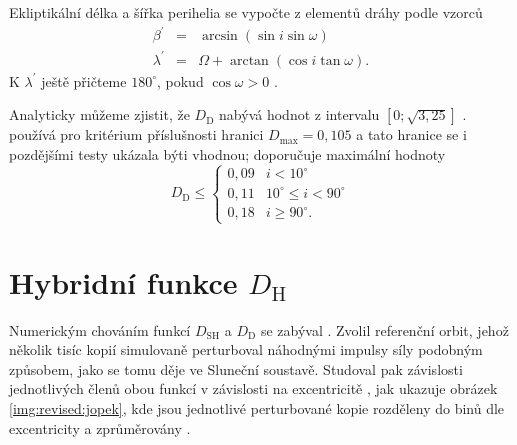 Ekliptikální délka a šířka perihelia se vypočte z elementů dráhy podle vzorců \cite{cometassoc}
\begin{eqnarray}
    \beta^\prime &=& \arcsin{\left( \sin{i}\sin{\omega} \right)}\\
    \lambda^\prime &=& \Omega + \arctan{\left( \cos{i}\tan{\omega} \right)} \text{.}
\end{eqnarray}
K $\lambda^\prime$ ještě přičteme $180^\circ$, pokud $\cos{\omega}>0$ \cite{cometassoc}.

\smallskip

Analyticky můžeme zjistit, že $D_\text{D}$ nabývá hodnot z intervalu $\left[ 0;\sqrt{3{,}25} \right]$ \cite{cometassoc}. \citeauthor{cometassoc} používá pro kritérium příslušnosti hranici $D_\text{max}=0{,}105$ \cite{cometassoc} a tato hranice se i pozdějšími testy ukázala býti vhodnou; \cite{galligan} doporučuje maximální hodnoty
$$
    D_\text{D} \le \begin{cases}
        0{,}09 & i < 10^\circ             \\
        0{,}11 & 10^\circ\le i < 90^\circ \\
        0{,}18 & i \ge 90^\circ \text{.}  %
    \end{cases}
$$

\section{Hybridní funkce $D_\text{H}$}%
Numerickým chováním funkcí $D_\text{SH}$ a $D_\text{D}$ se zabýval \citeauthor{remarks}. Zvolil referenční orbit, jehož několik tisíc kopií simulovaně perturboval náhodnými impulsy síly podobným způsobem, jako se tomu děje ve Sluneční soustavě. Studoval pak závislosti jednotlivých členů obou funkcí v závislosti na excentricitě \cite{remarks}, jak ukazuje obrázek \ref{img:revised:jopek}, kde jsou jednotlivé perturbované kopie rozděleny do binů dle excentricity a zprůměrovány \cite{remarks}.


